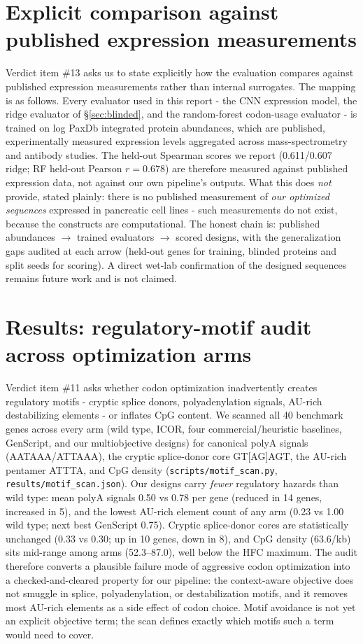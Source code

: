 \documentclass[11pt]{article}
\begin{document}
\section{Explicit comparison against published expression measurements}
\label{sec:published-expr}
Verdict item \#13 asks us to state explicitly how the evaluation compares against
published expression measurements rather than internal surrogates. The mapping is as
follows. Every evaluator used in this report - the CNN expression model, the ridge
evaluator of \S\ref{sec:blinded}, and the random-forest codon-usage evaluator - is
trained on log PaxDb integrated protein abundances, which are published,
experimentally measured expression levels aggregated across mass-spectrometry and
antibody studies. The held-out Spearman scores we report (0.611/0.607 ridge; RF
held-out Pearson $r=0.678$) are therefore measured against published expression data,
not against our own pipeline's outputs. What this does \emph{not} provide, stated
plainly: there is no published measurement of \emph{our optimized sequences} expressed
in pancreatic cell lines - such measurements do not exist, because the constructs are
computational. The honest chain is: published abundances $\to$ trained evaluators
$\to$ scored designs, with the generalization gaps audited at each arrow (held-out
genes for training, blinded proteins and split seeds for scoring). A direct wet-lab
confirmation of the designed sequences remains future work and is not claimed.


\section{Results: regulatory-motif audit across optimization arms}
\label{sec:motifs}
Verdict item \#11 asks whether codon optimization inadvertently creates regulatory
motifs - cryptic splice donors, polyadenylation signals, AU-rich destabilizing
elements - or inflates CpG content. We scanned all 40 benchmark genes across every
arm (wild type, ICOR, four commercial/heuristic baselines, GenScript, and our
multiobjective designs) for canonical polyA signals (AATAAA/ATTAAA), the cryptic
splice-donor core GT[AG]AGT, the AU-rich pentamer ATTTA, and CpG density
(\texttt{scripts/motif\_scan.py}, \texttt{results/motif\_scan.json}).
Our designs carry \emph{fewer} regulatory hazards than wild type: mean polyA signals
0.50 vs 0.78 per gene (reduced in 14 genes, increased in 5), and the lowest AU-rich
element count of any arm (0.23 vs 1.00 wild type; next best GenScript 0.75).
Cryptic splice-donor cores are statistically unchanged (0.33 vs 0.30; up in 10 genes,
down in 8), and CpG density (63.6/kb) sits mid-range among arms (52.3--87.0), well
below the HFC maximum. The audit therefore converts a plausible failure mode of
aggressive codon optimization into a checked-and-cleared property for our pipeline:
the context-aware objective does not smuggle in splice, polyadenylation, or
destabilization motifs, and it removes most AU-rich elements as a side effect of
codon choice. Motif avoidance is not yet an explicit objective term; the scan defines
exactly which motifs such a term would need to cover.
\end{document}
